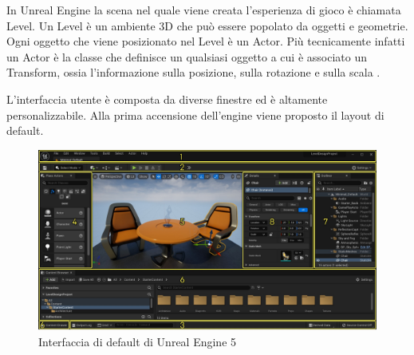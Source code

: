 In Unreal Engine la scena nel quale viene creata l'esperienza di gioco è chiamata Level.
%
Un Level è un ambiente 3D che può essere popolato da oggetti e geometrie.
%
Ogni oggetto che viene posizionato nel Level è un Actor.
%
Più tecnicamente infatti un Actor è la classe che definisce un qualsiasi oggetto a cui è associato un Transform, ossia l'informazione sulla posizione, sulla rotazione e sulla scala \cite{ULevelEditor}.

L'interfaccia utente è composta da diverse finestre ed è altamente personalizzabile.
%
Alla prima accensione dell'engine viene proposto il layout di default.

\begin{figure}[!ht]
    \centering
    \includegraphics[height=6cm]{figure/02-default-interface-windows.jpg}
    \caption{Interfaccia di default di Unreal Engine 5}
\end{figure}

